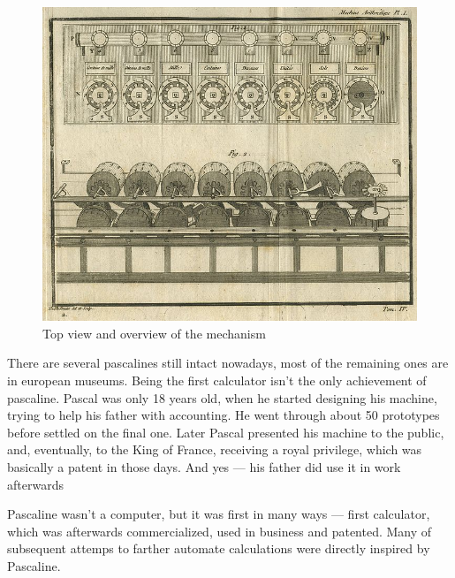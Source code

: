 \documentclass{article}
\begin{document}
            \begin{figure}
                \centering
                \includegraphics[scale=0.3]{images/devices/device_pascaline_scheme.jpg}
                \caption{Top view and overview of the mechanism}
            \end{figure}

            There are several pascalines still intact nowadays, most of the remaining ones are in european museums. Being the first calculator isn't the only achievement
            of pascaline. Pascal was only 18 years old, when he started designing his machine, trying to help his father with accounting. He went through about 50 prototypes
            before settled on the final one. Later Pascal presented his machine to the public, and, eventually, to the King of France, receiving a royal privilege, which 
            was basically a patent in those days. And yes --- his father did use it in work afterwards \par

            Pascaline wasn't a computer, but it was first in many ways --- first calculator, which was afterwards commercialized, used in business and patented. Many of 
            subsequent attemps to farther automate calculations were directly inspired by Pascaline. \par
\end{document}
